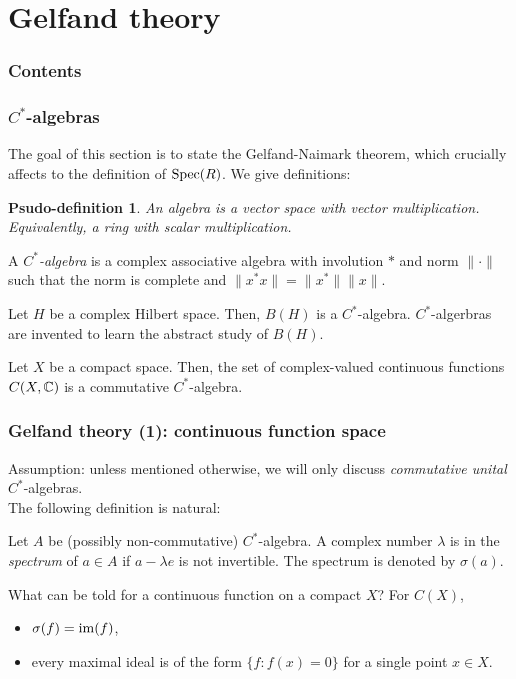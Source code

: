 \documentclass[10pt]{beamer}
\begin{document}
\section{Gelfand theory}
\begin{frame}
\frametitle{Contents}
  \tableofcontents[currentsection]
\end{frame}

\newtheorem{pdefn}{Psudo-definition}
\begin{frame}
\frametitle{$C^*$-algebras}
  The goal of this section is to state the Gelfand-Naimark theorem, which crucially affects to the definition of $\operatorname{Spec}(R)$.
  \pause We give definitions:
  \begin{pdefn}
    An \emph{algebra} is a vector space with vector multiplication.\\
    Equivalently, a ring with scalar multiplication.
  \end{pdefn}
  \pause
  \begin{defn}
    A \emph{$C^*$-algebra} is a complex associative algebra with involution $*$ and norm $\|\cdot\|$ such that the norm is complete and $\|x^*x\|=\|x^*\|\|x\|$.
  \end{defn}
  \pause
  \begin{ex}[1]
    Let $H$ be a complex Hilbert space.
    Then, $B(H)$ is a $C^*$-algebra.
    $C^*$-algerbras are invented to learn the abstract study of $B(H)$.
  \end{ex}
  \pause
  \begin{ex}[2]
    Let $X$ be a compact space.
    Then, the set of complex-valued continuous functions $C(X,\mathbb{C})$ is a commutative $C^*$-algebra.
  \end{ex}
\end{frame}

\begin{frame}
\frametitle{Gelfand theory (1): continuous function space}
  Assumption: unless mentioned otherwise, we will only discuss \emph{commutative unital} $C^*$-algebras.\\
  \smallskip\pause The following definition is natural:
  \begin{defn}
    Let $A$ be (possibly non-commutative) $C^*$-algebra.
    A complex number $\lambda$ is in the \emph{spectrum} of $a\in A$ if $a-\lambda e$ is not invertible.
    The spectrum is denoted by $\sigma(a)$.
  \end{defn}
  \bigskip\pause
  What can be told for a continuous function on a compact $X$? For $C(X)$,\pause
  \begin{itemize}[<+->]
    \item $\sigma(f)=\operatorname{im}(f)$,
    \item every maximal ideal is of the form $\{f:f(x)=0\}$ for a single point $x\in X$.
  \end{itemize}
\end{frame}
\end{document}
